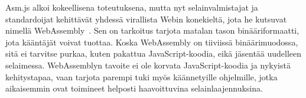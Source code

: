 Asm.js alkoi kokeellisena toteutuksena, mutta nyt selainvalmistajat ja standardoijat kehittävät yhdessä virallista Webin konekieltä, jota he kutsuvat nimellä WebAssembly~\cite{webassembly}. Sen on tarkoitus tarjota matalan tason binääriformaatti, jota kääntäjät voivat tuottaa. Koska WebAssembly on tiiviissä binäärimuodossa, sitä ei tarvitse purkaa, kuten pakattua JavaScript-koodia, eikä jäsentää uudelleen selaimessa. WebAssemblyn tavoite ei ole korvata JavaScript-koodia ja nykyistä kehitystapaa, vaan tarjota parempi tuki myös käännetyille ohjelmille, jotka aikaisemmin ovat toimineet helposti haavoittuvina selainlaajennuksina.

